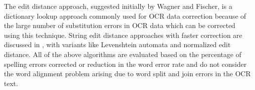 \documentclass[12pt]{article}
\begin{document}
The edit distance approach, suggested initially by Wagner and Fischer\cite{wagner1974string}, is a dictionary lookup approach commonly used for OCR data correction because of the large number of substitution errors in OCR data  \cite{kukich1992techniques}\cite{christen2006comparison} which can be corrected using this technique. String edit distance approaches with faster correction are discussed in \cite{marzal1993computation},\cite{schulz2002fast}  with variants like Levenshtein automata and normalized edit distance.
All of the above algorithms are evaluated based on the percentage of spelling errors corrected or reduction in the word error rate and do not consider the word alignment problem arising due to word split and join errors in the OCR text. 

\end{document}
